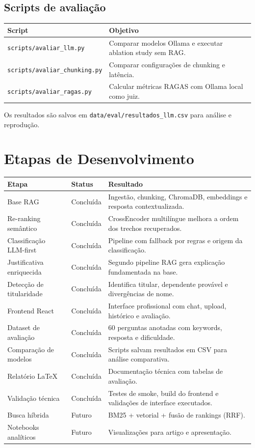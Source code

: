 \documentclass[11pt,a4paper,oneside]{article}
\begin{document}
\subsection{Scripts de avaliação}

\begin{center}
\begin{tabularx}{\textwidth}{@{}L{68mm}Y@{}}
\toprule
\textbf{Script} & \textbf{Objetivo} \\
\midrule
\texttt{scripts/avaliar\_llm.py} & Comparar modelos Ollama e executar ablation study sem RAG. \\
\texttt{scripts/avaliar\_chunking.py} & Comparar configurações de chunking e latência. \\
\texttt{scripts/avaliar\_ragas.py} & Calcular métricas RAGAS com Ollama local como juiz. \\
\bottomrule
\end{tabularx}
\end{center}

Os resultados são salvos em \texttt{data/eval/resultados\_llm.csv} para análise e reprodução.

\section{Etapas de Desenvolvimento}

\begin{longtable}{@{}L{62mm}L{22mm}L{72mm}@{}}
\toprule
\textbf{Etapa} & \textbf{Status} & \textbf{Resultado} \\
\midrule
\endhead
Base RAG & Concluída & Ingestão, chunking, ChromaDB, embeddings e resposta contextualizada. \\
Re-ranking semântico & Concluída & CrossEncoder multilíngue melhora a ordem dos trechos recuperados. \\
Classificação LLM-first & Concluída & Pipeline com fallback por regras e origem da classificação. \\
Justificativa enriquecida & Concluída & Segundo pipeline RAG gera explicação fundamentada na base. \\
Detecção de titularidade & Concluída & Identifica titular, dependente provável e divergências de nome. \\
Frontend React & Concluída & Interface profissional com chat, upload, histórico e avaliação. \\
Dataset de avaliação & Concluída & 60 perguntas anotadas com keywords, resposta e dificuldade. \\
Comparação de modelos & Concluída & Scripts salvam resultados em CSV para análise comparativa. \\
Relatório LaTeX & Concluída & Documentação técnica com tabelas de avaliação. \\
Validação técnica & Concluída & Testes de smoke, build do frontend e validações de interface executados. \\
Busca híbrida & Futuro & BM25 + vetorial + fusão de rankings (RRF). \\
Notebooks analíticos & Futuro & Visualizações para artigo e apresentação. \\
\bottomrule
\end{longtable}
\end{document}
